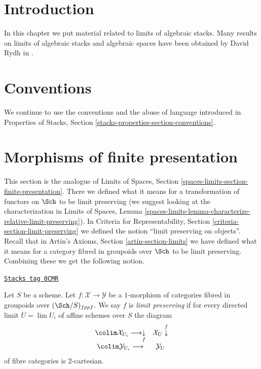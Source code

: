 \section{Introduction}
\label{stacks-limits-section-introduction}
In this chapter we put material related to limits of algebraic stacks.
Many results on limits of algebraic stacks and algebraic spaces
have been obtained by David Rydh in \cite{rydh_approx}.

\section{Conventions}
\label{stacks-limits-section-conventions}
We continue to use the conventions and the abuse of language
introduced in
Properties of Stacks, Section \ref{stacks-properties-section-conventions}.

\section{Morphisms of finite presentation}
\label{stacks-limits-section-finite-presentation}
This section is the analogue of Limits of Spaces, Section
\ref{spaces-limits-section-finite-presentation}.
There we defined what it means for a transformation of functors
on $\Sch$ to be limit preserving (we suggest looking at the
characterization in Limits of Spaces, Lemma
\ref{spaces-limits-lemma-characterize-relative-limit-preserving}).
In Criteria for Representability, Section
\ref{criteria-section-limit-preserving}
we defined the notion ``limit preserving on objects''.
Recall that in Artin's Axioms, Section \ref{artin-section-limits}
we have defined what it means for a category fibred in groupoids
over $\Sch$ to be limit preserving. Combining these we get
the following notion.

\begin{definition}
\label{stacks-limits-definition-limit-preserving}
\href{https://stacks.math.columbia.edu/tag/0CMR}{\texttt{Stacks tag 0CMR}}

Let $S$ be a scheme. Let $f : \mathcal{X} \to \mathcal{Y}$ be a
$1$-morphism of categories fibred in groupoids over $(\Sch/S)_{fppf}$.
We say $f$ is {\it limit preserving} if for every directed limit
$U = \lim U_i$ of affine schemes over $S$ the diagram
$$
\begin{array}{cc}\colim \mathcal{X}_{U_i} \longrightarrow\underset{f}{\downarrow} & \mathcal{X}_U \overset{f}{\downarrow} \\ \colim \mathcal{Y}_{U_i} \longrightarrow & \mathcal{Y}_U\end{array}
$$
of fibre categories is $2$-cartesian.
\end{definition}

